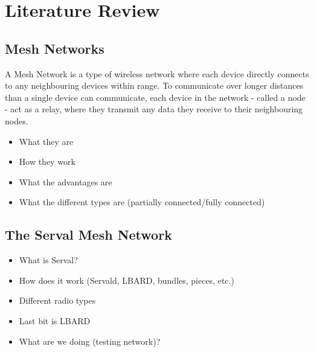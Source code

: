 
\chapter{Literature Review} %

\label{Chapter2} %


\section{Mesh Networks}
A Mesh Network is a type of wireless network where each device directly connects to any neighbouring devices within range.
To communicate over longer distances than a single device can communicate, each device in the network - called a node - act as a relay, where they transmit any data they receive to their neighbouring nodes.


\begin{itemize}
    \item What they are
    \item How they work
    \item What the advantages are
    \item What the different types are (partially connected/fully connected)
\end{itemize}

\section{The Serval Mesh Network}
\begin{itemize}
    \item What is Serval?
    \item How does it work (Servald, LBARD, bundles, pieces, etc.)
    \item Different radio types
    \item Last bit is LBARD
    \item What are we doing (testing network)?
\end{itemize}

    
